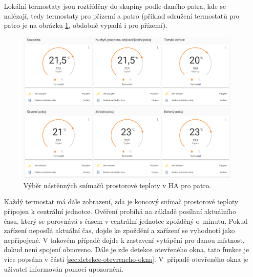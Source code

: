 Lokální termostaty jsou roztříděny do skupiny podle daného patra, kde se nalézají, tedy termostaty pro přízemí a patro (příklad sdružení termostatů pro patro je na obrázku \ref{fig:prehled-lokalnich-termostaty-patro}, obdobně vypadá i pro přízemí).

\begin{figure}[H]
    \centering
    \includegraphics[width=\textwidth]{images/software-ha/prehled-lokalnich-termostaty-patro.png}
    \caption{Výběr nástěnných snímačů prostorové teploty v HA pro patro.}
    \label{fig:prehled-lokalnich-termostaty-patro}
\end{figure}

Každý termostat má dále zobrazení, zda je koncový snímač prostorové teploty připojen k centrální jednotce.  Ověření probíhá na základě posílaní aktuálního času, který se porovnává s časem v centrální jednotce zpožděný o~minutu. Pokud zařízení neposílá aktuální čas, dojde ke zpoždění a zařízení se vyhodnotí jako nepřipojené. V takovém případě dojde k zastavení vytápění pro danou místnost, dokud není spojení obnoveno. Dále je zde detekce otevřeného okna, tato funkce je více popsána v části \ref{sec:detekce-otevreneho-okna}. V~případě otevřeného okna je uživatel informován pomocí upozornění. 



